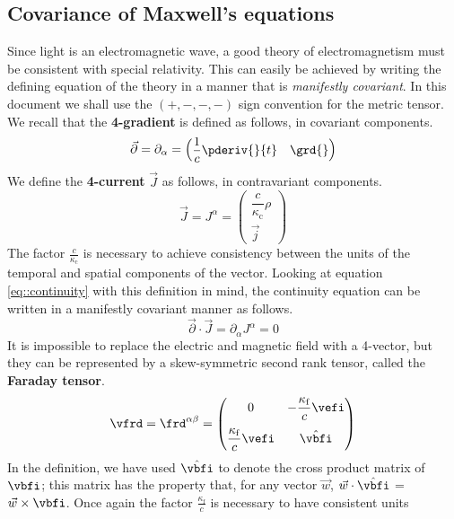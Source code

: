 \subsection{Covariance of Maxwell's equations}
%
Since light is an electromagnetic wave, a good theory of electromagnetism must be
consistent with special relativity. This can easily be achieved by writing the
defining equation of the theory in a manner that is \emph{manifestly covariant}.
In this document we shall use the \((+,-,-,-)\) sign convention for the metric tensor.\\[1em]
We recall that the \textbf{4-gradient} is defined as follows, in covariant components.
\[\vec{\partial} = \partial_\alpha = \begin{pmatrix}\displaystyle \frac{1}{c} \pderiv{}{t} & \grd{}\end{pmatrix}\]
We define the \textbf{4-current} \(\vec{J}\) as follows, in contravariant components.
\begin{equation}
  \vec{J} = J^\alpha = \begin{pmatrix}\dfrac{c}{\kappa_\mathrm{c}}\rho \\[1em] \vec{j}\end{pmatrix}
\end{equation}
The factor \(\frac{c}{\kappa_\mathrm{c}}\) is necessary to achieve consistency between the
units of the temporal and spatial components of the vector. Looking at equation
\eqref{eq::continuity} with this definition in mind, the continuity
equation can be written in a manifestly covariant manner as follows.
\begin{equation}
  \vec{\partial} \cdot \vec{J} = \partial_\alpha J^\alpha = 0
\end{equation}
It is impossible to replace the electric and magnetic field with a 4-vector, but
they can be represented by a skew-symmetric second rank tensor, called the \textbf{Faraday tensor}.
\begin{equation}
  \vfrd = \frd^{\alpha\beta} = \begin{pmatrix} 0 & -\dfrac{\kappa_\mathrm{f}}{c} \vefi \\[1em] \dfrac{\kappa_\mathrm{f}}{c} \vefi & \hat{\vbfi} \\ \end{pmatrix}
\end{equation}
In the definition, we have used \(\hat{\vbfi}\) to denote the cross product matrix
of \(\vbfi\); this matrix has the property that, for any vector \(\vec{w}\),
\(\vec{w} \cdot \hat{\vbfi}\) = \(\vec{w} \times \vbfi\).
Once again the factor \(\frac{\kappa_\mathrm{f}}{c}\) is necessary to have consistent units
